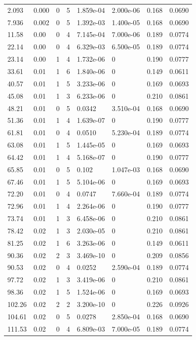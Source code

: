 \documentclass[preview]{standalone}
\begin{document}
{{\begin{tabular}{L{1.2cm}C{1.2cm} C{0.3cm}C{0.5cm} C{1.4cm}C{1.4cm} C{1.4cm}C{1.4cm}}
  2.093  &  0.000  & 0     &  5 &  1.859e-04  & 2.000e-06  & 0.168 &  0.0690   \\ 
  7.936  &  0.002  & 0     &  5 &  1.392e-03  & 1.400e-05  & 0.168 &  0.0690   \\ 
  11.58  &  0.00  & 0     &  4 &  7.145e-04  & 7.000e-06  & 0.189 &  0.0774   \\ 
  22.14  &  0.00  & 0     &  4 &  6.329e-03  & 6.500e-05  & 0.189 &  0.0774   \\ 
  23.14  &  0.00  & 1     &  4 &  1.732e-06  & 0  & 0.190 &  0.0777   \\ 
  33.61  &  0.01  & 1     &  6 &  1.840e-06  & 0  & 0.149 &  0.0611   \\ 
  40.57  &  0.01  & 1     &  5 &  3.233e-06  & 0  & 0.169 &  0.0693   \\ 
  45.08  &  0.01  & 1     &  3 &  6.233e-06  & 0  & 0.210 &  0.0861   \\ 
  48.21  &  0.01  & 0     &  5 &  0.0342  & 3.510e-04  & 0.168 &  0.0690   \\ 
  51.36  &  0.01  & 1     &  4 &  1.639e-07  & 0  & 0.190 &  0.0777   \\ 
  61.81  &  0.01  & 0     &  4 &  0.0510  & 5.230e-04  & 0.189 &  0.0774   \\ 
  63.08  &  0.01  & 1     &  5 &  1.445e-05  & 0  & 0.169 &  0.0693   \\ 
  64.42  &  0.01  & 1     &  4 &  5.168e-07  & 0  & 0.190 &  0.0777   \\ 
  65.85  &  0.01  & 0     &  5 &  0.102  & 1.047e-03  & 0.168 &  0.0690   \\ 
  67.46  &  0.01  & 1     &  5 &  5.104e-06  & 0  & 0.169 &  0.0693   \\ 
  72.20  &  0.01  & 0     &  4 &  0.0747  & 7.660e-04  & 0.189 &  0.0774   \\ 
  72.96  &  0.01  & 1     &  4 &  2.264e-06  & 0  & 0.190 &  0.0777   \\ 
  73.74  &  0.01  & 1     &  3 &  6.458e-06  & 0  & 0.210 &  0.0861   \\ 
  78.42  &  0.02  & 1     &  3 &  2.030e-05  & 0  & 0.210 &  0.0861   \\ 
  81.25  &  0.02  & 1     &  6 &  3.263e-06  & 0  & 0.149 &  0.0611   \\ 
  90.36  &  0.02  & 2     &  3 &  3.469e-10  & 0  & 0.209 &  0.0856   \\ 
  90.53  &  0.02  & 0     &  4 &  0.0252  & 2.590e-04  & 0.189 &  0.0774   \\ 
  97.72  &  0.02  & 1     &  3 &  3.419e-06  & 0  & 0.210 &  0.0861   \\ 
  98.36  &  0.02  & 1     &  5 &  1.524e-06  & 0  & 0.169 &  0.0693   \\ 
  102.26  &  0.02  & 2     &  2 &  3.200e-10  & 0  & 0.226 &  0.0926   \\ 
  104.61  &  0.02  & 0     &  5 &  0.0278  & 2.850e-04  & 0.168 &  0.0690   \\ 
  111.53  &  0.02  & 0     &  4 &  6.809e-03  & 7.000e-05  & 0.189 &  0.0774   \\ 
\hline 
\end{tabular} 

}}
\end{document}
